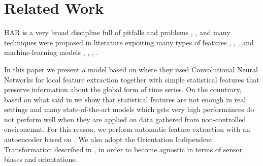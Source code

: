 
\section{Related Work}
\label{sec:related-work}

HAR is a very broad discipline full of pitfalls and problems
\cite{blunck2013heterogeneity}, \cite{chen2020deep},
\cite{stisen2015smart} and many techniques were proposed in literature
expoiting many types of features \cite{stisen2015smart},
\cite{ignatov2018real}, \cite{vincent2010stacked},
\cite{anguita2013public} and machine-learning models
\cite{ignatov2018real}, \cite{rao1964use}, \cite{gao2019human},
\cite{gadaleta2018idnet}.

In this paper we present a model based on \cite{ignatov2018real} where
they used Convolutional Neural Networks for local feature extraction
together with simple statistical features that preserve information
about the global form of time series. On the countrary, based on what
said in \cite{stisen2015smart} we show that statistical features are
not enough in real settings and many state-of-the-art models which
gets very high performances do not perform well when they are applied
on data gathered from non-controlled environemnt. For this reason, we
perform automatic feature extraction with an autoencoder based on
\cite{gao2019human}. We also adopt the Orientation Indipendent
Transformation described in \cite{gadaleta2018idnet}, in order to
become agnostic in terms of sensor biases and orientations.
